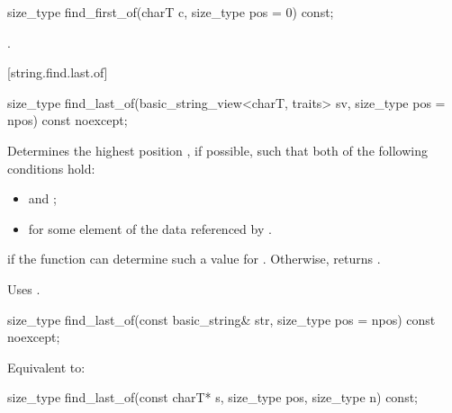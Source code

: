 %
\begin{itemdecl}
size_type find_first_of(charT c, size_type pos = 0) const;
\end{itemdecl}

\begin{itemdescr}
\pnum
\returns
{}.
\end{itemdescr}

[string.find.last.of]{}

%
\begin{itemdecl}
size_type find_last_of(basic_string_view<charT, traits> sv, size_type pos = npos) const noexcept;
\end{itemdecl}

\begin{itemdescr}
\pnum
\effects
Determines the highest position , if possible, such that both of
the following conditions hold:
\begin{itemize}
\item
{}
and
;
\item
{}%
for some element  of the data referenced by .
\end{itemize}

\pnum
\returns
{} if the function can determine such a value for .
Otherwise, returns
.

\pnum
\remarks
Uses
.
\end{itemdescr}

%
\begin{itemdecl}
size_type find_last_of(const basic_string& str, size_type pos = npos) const noexcept;
\end{itemdecl}

\begin{itemdescr}
\pnum
\effects
Equivalent to: 
\end{itemdescr}

%
\begin{itemdecl}
size_type find_last_of(const charT* s, size_type pos, size_type n) const;
\end{itemdecl}

